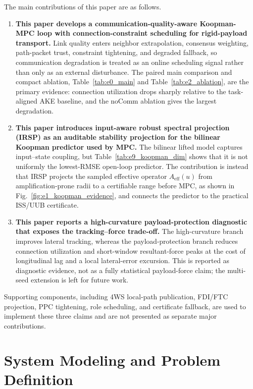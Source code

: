 \documentclass[twocolumn,3p,times,procedia]{elsarticle}
\begin{document}
The main contributions of this paper are as follows.
\begin{enumerate}
\item \textbf{This paper develops a communication-quality-aware Koopman-MPC loop with connection-constraint scheduling for rigid-payload transport.} Link quality enters neighbor extrapolation, consensus weighting, path-packet trust, constraint tightening, and degraded fallback, so communication degradation is treated as an online scheduling signal rather than only as an external disturbance. The paired main comparison and compact ablation, Table~\ref{tab:e0_main} and Table~\ref{tab:e2_ablation}, are the primary evidence: connection utilization drops sharply relative to the task-aligned AKE baseline, and the noComm ablation gives the largest degradation.
\item \textbf{This paper introduces input-aware robust spectral projection (IRSP) as an auditable stability projection for the bilinear Koopman predictor used by MPC.} The bilinear lifted model captures input--state coupling, but Table~\ref{tab:e9_koopman_dim} shows that it is not uniformly the lowest-RMSE open-loop predictor. The contribution is instead that IRSP projects the sampled effective operator $A_{\mathrm{eff}}(u)$ from amplification-prone radii to a certifiable range before MPC, as shown in Fig.~\ref{fig:e1_koopman_evidence}, and connects the predictor to the practical ISS/UUB certificate.
\item \textbf{This paper reports a high-curvature payload-protection diagnostic that exposes the tracking--force trade-off.} The high-curvature branch improves lateral tracking, whereas the payload-protection branch reduces connection utilization and short-window resultant-force peaks at the cost of longitudinal lag and a local lateral-error excursion. This is reported as diagnostic evidence, not as a fully statistical payload-force claim; the multi-seed extension is left for future work.
\end{enumerate}

Supporting components, including 4WS local-path publication, FDI/FTC projection, PPC tightening, role scheduling, and certificate fallback, are used to implement these three claims and are not presented as separate major contributions.

\section{System Modeling and Problem Definition}
\end{document}

